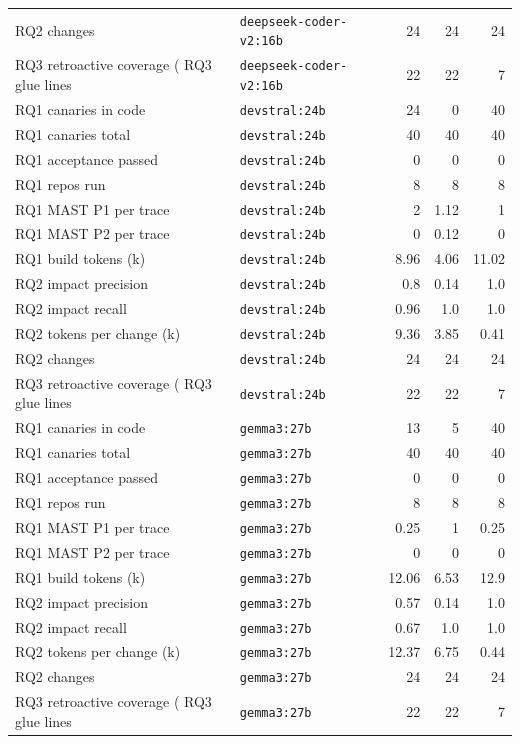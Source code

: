 \begin{tabular}{llrrr}
RQ2 changes & \texttt{deepseek-coder-v2:16b} & 24 & 24 & 24 \\
RQ3 retroactive coverage (%
RQ3 glue lines & \texttt{deepseek-coder-v2:16b} & 22 & 22 & 7 \\
RQ1 canaries in code & \texttt{devstral:24b} & 24 & 0 & 40 \\
RQ1 canaries total & \texttt{devstral:24b} & 40 & 40 & 40 \\
RQ1 acceptance passed & \texttt{devstral:24b} & 0 & 0 & 0 \\
RQ1 repos run & \texttt{devstral:24b} & 8 & 8 & 8 \\
RQ1 MAST P1 per trace & \texttt{devstral:24b} & 2 & 1.12 & 1 \\
RQ1 MAST P2 per trace & \texttt{devstral:24b} & 0 & 0.12 & 0 \\
RQ1 build tokens (k) & \texttt{devstral:24b} & 8.96 & 4.06 & 11.02 \\
RQ2 impact precision & \texttt{devstral:24b} & 0.8 & 0.14 & 1.0 \\
RQ2 impact recall & \texttt{devstral:24b} & 0.96 & 1.0 & 1.0 \\
RQ2 tokens per change (k) & \texttt{devstral:24b} & 9.36 & 3.85 & 0.41 \\
RQ2 changes & \texttt{devstral:24b} & 24 & 24 & 24 \\
RQ3 retroactive coverage (%
RQ3 glue lines & \texttt{devstral:24b} & 22 & 22 & 7 \\
RQ1 canaries in code & \texttt{gemma3:27b} & 13 & 5 & 40 \\
RQ1 canaries total & \texttt{gemma3:27b} & 40 & 40 & 40 \\
RQ1 acceptance passed & \texttt{gemma3:27b} & 0 & 0 & 0 \\
RQ1 repos run & \texttt{gemma3:27b} & 8 & 8 & 8 \\
RQ1 MAST P1 per trace & \texttt{gemma3:27b} & 0.25 & 1 & 0.25 \\
RQ1 MAST P2 per trace & \texttt{gemma3:27b} & 0 & 0 & 0 \\
RQ1 build tokens (k) & \texttt{gemma3:27b} & 12.06 & 6.53 & 12.9 \\
RQ2 impact precision & \texttt{gemma3:27b} & 0.57 & 0.14 & 1.0 \\
RQ2 impact recall & \texttt{gemma3:27b} & 0.67 & 1.0 & 1.0 \\
RQ2 tokens per change (k) & \texttt{gemma3:27b} & 12.37 & 6.75 & 0.44 \\
RQ2 changes & \texttt{gemma3:27b} & 24 & 24 & 24 \\
RQ3 retroactive coverage (%
RQ3 glue lines & \texttt{gemma3:27b} & 22 & 22 & 7 \\
\bottomrule
\end{tabular}
